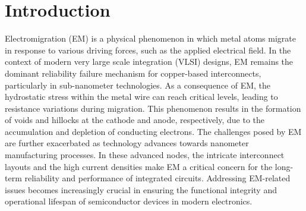 \section{Introduction}
\label{sec:intro}


Electromigration (EM) is a physical phenomenon in which metal atoms migrate in response to various driving forces, such as the applied electrical field. In the context of modern very large scale integration (VLSI) designs, EM remains the dominant reliability failure mechanism for copper-based interconnects, particularly in sub-nanometer technologies. As a consequence of EM, the hydrostatic stress within the metal wire can reach critical levels, leading to resistance variations during migration. This phenomenon results in the formation of voids and hillocks at the cathode and anode, respectively, due to the accumulation and depletion of conducting electrons.
The challenges posed by EM are further exacerbated as technology advances towards nanometer manufacturing processes. In these advanced nodes, the intricate interconnect layouts and the high current densities make EM a critical concern for the long-term reliability and performance of integrated circuits. Addressing EM-related issues becomes increasingly crucial in ensuring the functional integrity and operational lifespan of semiconductor devices in modern electronics.



